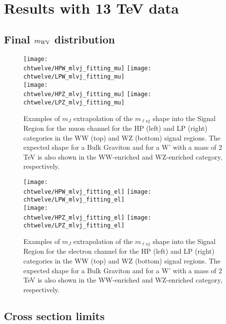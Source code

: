 \chapter{Results with 13 TeV data}
\label{ch:results13}

\section{Final $m_{\rm WV}$ distribution}

\begin{figure}[htbp]
\centering
\texttt{[image: \\chtwelve/HPW\_mlvj\_fitting\_mu]}%
\texttt{[image: \\chtwelve/LPW\_mlvj\_fitting\_mu]}\\
\texttt{[image: \\chtwelve/HPZ\_mlvj\_fitting\_mu]}
\texttt{[image: \\chtwelve/LPZ\_mlvj\_fitting\_mu]}\\
\caption{Examples of $m_J$ extrapolation of the $m_{\ell\nu j}$ shape into the Signal Region
for the muon channel for the HP (left) and LP (right) categories in the WW (top) and WZ (bottom) signal regions.
The expected shape for a Bulk Graviton and for a W' with a mass of 2 TeV is also shown
in the WW-enriched and WZ-enriched category, respectively.}
\label{fig:srFits_mu}
\end{figure}

\begin{figure}[htbp]
\centering
\texttt{[image: \\chtwelve/HPW\_mlvj\_fitting\_el]}%
\texttt{[image: \\chtwelve/LPW\_mlvj\_fitting\_el]}\\
\texttt{[image: \\chtwelve/HPZ\_mlvj\_fitting\_el]}
\texttt{[image: \\chtwelve/LPZ\_mlvj\_fitting\_el]}\\
\caption{Examples of $m_J$ extrapolation of the $m_{\ell\nu j}$ shape into the Signal Region
for the electron channel for the HP (left) and LP (right) categories in the WW (top) and WZ (bottom) signal regions.
The expected shape for a Bulk Graviton and for a W' with a mass of 2 TeV is also shown
in the WW-enriched and WZ-enriched category, respectively.}
\label{fig:srFits_el}
\end{figure}

\section{Cross section limits}

